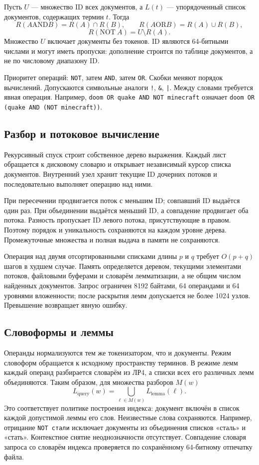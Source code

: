 \documentclass[12pt,a4paper]{article}
\begin{document}
Пусть $U$ --- множество ID всех документов, а $L(t)$ --- упорядоченный
список документов, содержащих термин $t$. Тогда
\[
R(A\mathbin{\mathrm{AND}}B)=R(A)\cap R(B),\qquad
R(A\mathbin{\mathrm{OR}}B)=R(A)\cup R(B),
\]
\[
R(\mathrm{NOT}\ A)=U\setminus R(A).
\]
Множество $U$ включает документы без токенов. ID являются
64-битными числами и могут иметь пропуски: дополнение строится
по таблице документов, а не по числовому диапазону ID.

Приоритет операций: \texttt{NOT}, затем \texttt{AND}, затем \texttt{OR}.
Скобки меняют порядок вычислений. Допускаются символьные аналоги
\texttt{!}, \texttt{\&}, \texttt{|}. Между словами требуется явная операция.
Например, \texttt{doom OR quake AND NOT minecraft} означает
\texttt{doom OR (quake AND (NOT minecraft))}.

\subsection{Разбор и потоковое вычисление}
Рекурсивный спуск строит собственное дерево выражения.
Каждый лист обращается к дисковому словарю и открывает независимый
курсор списка документов. Внутренний узел хранит текущие ID
дочерних потоков и последовательно выполняет операцию над ними.

При пересечении продвигается поток с меньшим ID; совпавший ID выдаётся
один раз. При объединении выдаётся меньший ID, а совпадение продвигает
оба потока. Разность пропускает ID левого потока, присутствующие в правом.
Поэтому порядок и уникальность сохраняются на каждом уровне дерева.
Промежуточные множества и полная выдача в памяти не сохраняются.

Операция над двумя отсортированными списками длины $p$ и $q$ требует
$O(p+q)$ шагов в худшем случае. Память определяется деревом,
текущими элементами потоков, файловыми буферами и словарём лемматизации,
а не общим числом найденных документов. Запрос ограничен 8192 байтами,
64 операндами и 64 уровнями вложенности; после раскрытия лемм
допускается не более 1024 узлов. Превышение возвращает явную ошибку.

\subsection{Словоформы и леммы}
Операнды нормализуются тем же токенизатором, что и документы.
Режим словоформ обращается к исходному пространству терминов.
В режиме лемм каждый операнд разбирается словарём из ЛР4,
а списки всех его различных лемм объединяются.
Таким образом, для множества разборов $M(w)$
\[
L_{\mathrm{query}}(w)=\bigcup_{\ell\in M(w)}L_{\mathrm{lemma}}(\ell).
\]
Это соответствует политике построения индекса: документ включён
в список каждой допустимой леммы его слов. Неизвестные слова сохраняются.
Например, отрицание \texttt{NOT стали} исключает документы из объединения
списков «сталь» и «стать». Контекстное снятие неоднозначности отсутствует.
Совпадение словаря запроса со словарём индекса проверяется
по сохранённому 64-битному отпечатку файла.
\end{document}
